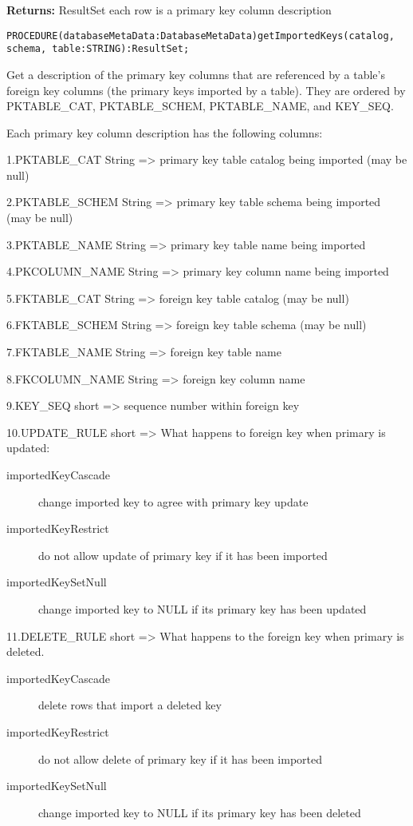 {\bf Returns: } 
ResultSet each row is a primary key column description 




\verb'PROCEDURE(databaseMetaData:DatabaseMetaData)getImportedKeys(catalog, schema, table:STRING):ResultSet;'



Get a description of the primary key columns that are referenced by a table's foreign key columns (the primary keys imported by a table). They are ordered by PKTABLE\_CAT, PKTABLE\_SCHEM, PKTABLE\_NAME, and KEY\_SEQ. 

Each primary key column description has the following columns: 

1.PKTABLE\_CAT String => primary key table catalog being imported (may be null) 

2.PKTABLE\_SCHEM String => primary key table schema being imported (may be null) 

3.PKTABLE\_NAME String => primary key table name being imported 

4.PKCOLUMN\_NAME String => primary key column name being imported 

5.FKTABLE\_CAT String => foreign key table catalog (may be null) 

6.FKTABLE\_SCHEM String => foreign key table schema (may be null) 

7.FKTABLE\_NAME String => foreign key table name 

8.FKCOLUMN\_NAME String => foreign key column name 

9.KEY\_SEQ short => sequence number within foreign key 

10.UPDATE\_RULE short => What happens to foreign key when primary is updated: 
\begin{description}
\item[importedKeyCascade] change imported key to agree with primary key update 
\item[importedKeyRestrict] do not allow update of primary key if it has been imported 
\item[importedKeySetNull] change imported key to NULL if its primary key has been updated 
\end{description}

11.DELETE\_RULE short => What happens to the foreign key when primary is deleted. 
\begin{description}
\item[importedKeyCascade] delete rows that import a deleted key 
\item[importedKeyRestrict] do not allow delete of primary key if it has been imported
\item[importedKeySetNull] change imported key to NULL if its primary key has been deleted 
\end{description}

